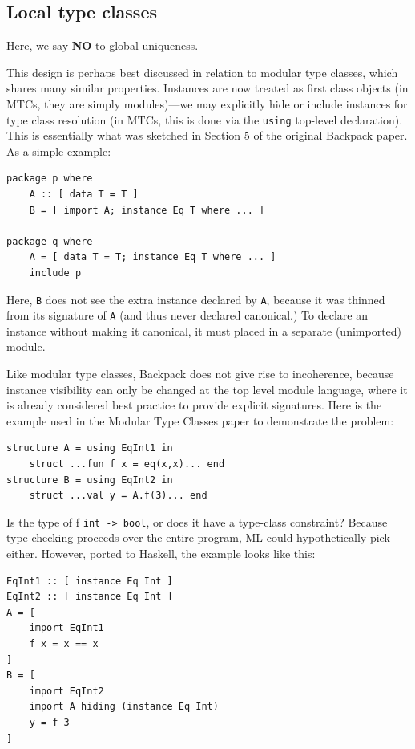 \documentclass{article}
\begin{document}
\subsection{Local type classes}

Here, we say \textbf{NO} to global uniqueness.

This design is perhaps best discussed in relation to modular type
classes, which shares many similar properties.  Instances are now
treated as first class objects (in MTCs, they are simply modules)---we
may explicitly hide or include instances for type class resolution (in
MTCs, this is done via the \verb|using| top-level declaration).  This is
essentially what was sketched in Section 5 of the original Backpack
paper.  As a simple example:

\begin{verbatim}
package p where
    A :: [ data T = T ]
    B = [ import A; instance Eq T where ... ]

package q where
    A = [ data T = T; instance Eq T where ... ]
    include p
\end{verbatim}

Here, \verb|B| does not see the extra instance declared by \verb|A|,
because it was thinned from its signature of \verb|A| (and thus never
declared canonical.)  To declare an instance without making it
canonical, it must placed in a separate (unimported) module.

Like modular type classes, Backpack does not give rise to incoherence,
because instance visibility can only be changed at the top level module
language, where it is already considered best practice to provide
explicit signatures.  Here is the example used in the Modular Type
Classes paper to demonstrate the problem:

\begin{verbatim}
structure A = using EqInt1 in
    struct ...fun f x = eq(x,x)... end
structure B = using EqInt2 in
    struct ...val y = A.f(3)... end
\end{verbatim}

Is the type of f \verb|int -> bool|, or does it have a type-class
constraint?  Because type checking proceeds over the entire program, ML
could hypothetically pick either.  However, ported to Haskell, the
example looks like this:

\begin{verbatim}
EqInt1 :: [ instance Eq Int ]
EqInt2 :: [ instance Eq Int ]
A = [
    import EqInt1
    f x = x == x
]
B = [
    import EqInt2
    import A hiding (instance Eq Int)
    y = f 3
]
\end{verbatim}
\end{document}
